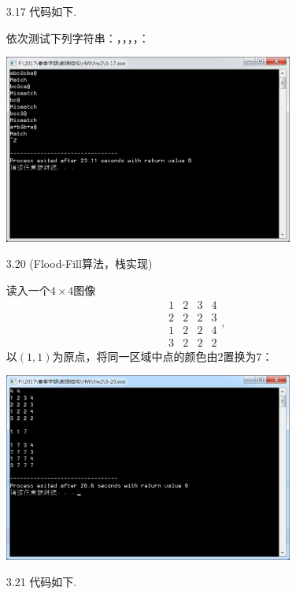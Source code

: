 \documentclass[11pt,a4paper]{ctexart}
\begin{document}
\begin{enumerate}
	\begin{lstlisting}[language=c]
void test(int *sum) {
	SqStack s;
	int x;
	
	InitStack(&s);
	do {
		scanf("%d", &x);
		Push(&s, &x);
	} while (x != 0);
	while (!StackEmpty(&s)) {
		Pop(&s, &x);
		*sum += x;
		printf("%d\n", *sum);
	}
	DestoryStack(&s);
}
	\end{lstlisting}
	\item[3.17]代码如下.
	
	
	依次测试下列字符串：，，，，：
	
	\mbox{\includegraphics[width=0.75\textwidth]{hw2/screenshot/3-17}}
	\item[3.20](Flood-Fill算法，栈实现)
	
	
	读入一个$4\times 4$图像
	\[\begin{matrix}
	1 & 2 & 3 & 4\\
	2 & 2 & 2 & 3\\
	1 & 2 & 2 & 4\\
	3 & 2 & 2 & 2
	\end{matrix},\]
	以$(1,1)$为原点，将同一区域中点的颜色由$2$置换为$7$：
	
	\mbox{\includegraphics[width=0.75\textwidth]{hw2/screenshot/3-20}}
	\item[3.21]代码如下.
	
	

\end{enumerate}
\end{document}

